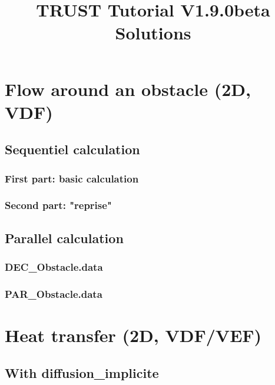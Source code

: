 \documentclass[english]{article}
\begin{document}
\title{TRUST Tutorial V1.9.0beta Solutions}
\maketitle
\tableofcontents{}
\newpage

\section{Flow around an obstacle (2D, VDF)}
\subsection{Sequentiel calculation}
\subsubsection{First part: basic calculation}

\subsubsection{Second part: "reprise"}


\subsection{Parallel calculation}
\subsubsection{DEC\_Obstacle.data}

\subsubsection{PAR\_Obstacle.data}



\section{Heat transfer (2D, VDF/VEF)}
\subsection{With diffusion\_implicite}

\end{document}
